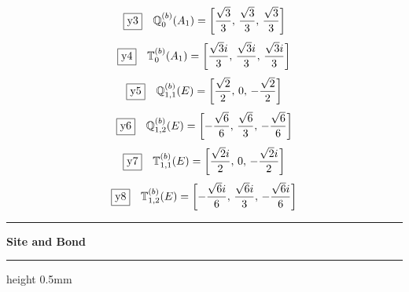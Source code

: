 \documentclass[fleqn,10pt,landscape]{jsarticle}
\begin{document}
\begin{dmath*}
\fbox{y3}\quad \mathbb{Q}_{0}^{(b)}(A_{1})=\left[ \frac{\sqrt{3}}{3},\, \frac{\sqrt{3}}{3},\, \frac{\sqrt{3}}{3} \right]
\end{dmath*}
\begin{dmath*}
\fbox{y4}\quad \mathbb{T}_{0}^{(b)}(A_{1})=\left[ \frac{\sqrt{3} i}{3},\, \frac{\sqrt{3} i}{3},\, \frac{\sqrt{3} i}{3} \right]
\end{dmath*}
\begin{dmath*}
\fbox{y5}\quad \mathbb{Q}_{1,1}^{(b)}(E)=\left[ \frac{\sqrt{2}}{2},\, 0,\, - \frac{\sqrt{2}}{2} \right]
\end{dmath*}
\begin{dmath*}
\fbox{y6}\quad \mathbb{Q}_{1,2}^{(b)}(E)=\left[ - \frac{\sqrt{6}}{6},\, \frac{\sqrt{6}}{3},\, - \frac{\sqrt{6}}{6} \right]
\end{dmath*}
\begin{dmath*}
\fbox{y7}\quad \mathbb{T}_{1,1}^{(b)}(E)=\left[ \frac{\sqrt{2} i}{2},\, 0,\, - \frac{\sqrt{2} i}{2} \right]
\end{dmath*}
\begin{dmath*}
\fbox{y8}\quad \mathbb{T}_{1,2}^{(b)}(E)=\left[ - \frac{\sqrt{6} i}{6},\, \frac{\sqrt{6} i}{3},\, - \frac{\sqrt{6} i}{6} \right]
\end{dmath*}
\vspace{5mm}
\noindent \rule[0.5mm]{5mm}{0.5mm}\hspace{3mm}\textbf{Site and Bond}\hspace{3mm}\leaders\hrule height 0.5mm\hfill\kern0pt
\vspace{3mm}
\end{document}

